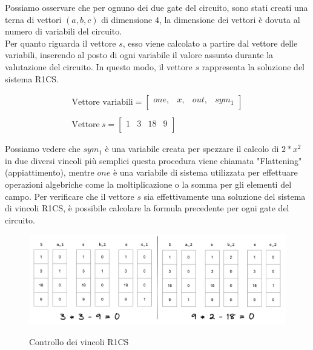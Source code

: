 \begin{enumerate}
    Possiamo osservare che per ognuno dei due gate del circuito, sono stati creati una terna di vettori $(a,b,c)$ di
    dimensione 4, la dimensione dei vettori è dovuta al numero di variabili del circuito. \\
    Per quanto riguarda il vettore $s$, esso viene calcolato a partire dal vettore delle variabili,
    inserendo al posto di ogni variabile il valore assunto durante la valutazione del circuito. In questo modo, il
    vettore $s$ rappresenta la soluzione del sistema R1CS.

    \begin{gather*}
        \text{Vettore variabili} =
        \begin{bmatrix}
            one, & x, & out, & sym_1 \\
        \end{bmatrix}
        \\
        \\
        \text{Vettore} \ s =
        \begin{bmatrix}
        1 & 3 & 18 & 9 \\
        \end{bmatrix}
    \end{gather*}

    Possiamo vedere che $sym_1$ è una variabile creata per spezzare il calcolo di $2*x^2$ in due diversi vincoli più
    semplici questa procedura viene chiamata "Flattening" (appiattimento), mentre $one$ è una variabile di sistema
    utilizzata per effettuare operazioni algebriche come la moltiplicazione o la somma per gli elementi del campo. Per
    verificare che il vettore $s$ sia effettivamente una soluzione del sistema di vincoli R1CS, è possibile calcolare la
    formula precedente per ogni gate del circuito.

    \begin{figure}[H]
        \centering
        \includegraphics[width=15cm]{./chapters/1.state-of-art/images/10.check_r1cs.png}
        \label{fig:check-r1cs}
        \captionsetup{justification=centering}
        \caption{Controllo dei vincoli R1CS}
    \end{figure}


\end{enumerate}
